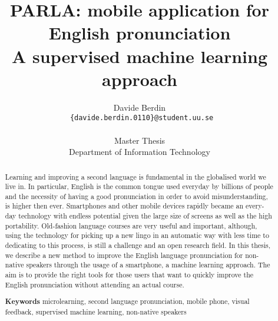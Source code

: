 \documentclass{report}
\title{PARLA: mobile application for English pronunciation \\ A supervised machine learning approach}
\author{Davide Berdin \\
  \texttt{ \{davide.berdin.0110\}@student.uu.se} \\
  \\ Master Thesis
  \\ Department of Information Technology}
\newcommand\blankpage{%
    \null
    \thispagestyle{empty}%
    \addtocounter{page}{-1}%
    \newpage}
\begin{document}
\maketitle


\blankpage

\blankpage

\begin{abstract}
Learning and improving a second language is fundamental in the globalised world we live in. In particular, English is the common tongue used everyday by billions of people and the necessity of having a good pronunciation in order to avoid misunderstanding, is higher then ever. Smartphones and other mobile devices rapidly became an every-day technology with endless potential given the large size of screens as well as the high portability. Old-fashion language courses are very useful and important, although, using the technology for picking up a new lingo in an automatic way with less time to dedicating to this process, is still a challenge and an open research field. In this thesis, we describe a new method to improve the English language pronunciation for non-native speakers through the usage of a smartphone, a machine learning approach. The aim is to provide the right tools for those users that want to quickly improve the English pronunciation without attending an actual course. \vspace{7in}

\noindent \textbf{Keywords} microlearning, second language pronunciation, mobile phone, visual feedback, supervised machine learning, non-native speakers
\end{abstract}

\blankpage
\end{document}
